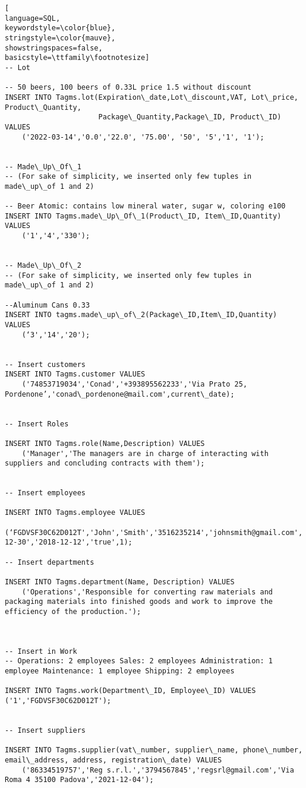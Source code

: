 \begin{lstlisting}[
language=SQL,
keywordstyle=\color{blue},
stringstyle=\color{mauve},
showstringspaces=false,
basicstyle=\ttfamily\footnotesize]
-- Lot

-- 50 beers, 100 beers of 0.33L price 1.5 without discount
INSERT INTO Tagms.lot(Expiration\_date,Lot\_discount,VAT, Lot\_price, Product\_Quantity,
                      Package\_Quantity,Package\_ID, Product\_ID) VALUES
    ('2022-03-14','0.0','22.0', '75.00', '50', '5','1', '1');


-- Made\_Up\_Of\_1
-- (For sake of simplicity, we inserted only few tuples in made\_up\_of 1 and 2)

-- Beer Atomic: contains low mineral water, sugar w, coloring e100
INSERT INTO Tagms.made\_Up\_Of\_1(Product\_ID, Item\_ID,Quantity) VALUES
    ('1','4','330');


-- Made\_Up\_Of\_2
-- (For sake of simplicity, we inserted only few tuples in made\_up\_of 1 and 2)

--Aluminum Cans 0.33
INSERT INTO tagms.made\_up\_of\_2(Package\_ID,Item\_ID,Quantity) VALUES
    (‘3','14','20');									


-- Insert customers
INSERT INTO Tagms.customer VALUES
    ('74853719034','Conad','+393895562233','Via Prato 25, Pordenone’,'conad\_pordenone@mail.com',current\_date);


-- Insert Roles

INSERT INTO Tagms.role(Name,Description) VALUES
    ('Manager','The managers are in charge of interacting with suppliers and concluding contracts with them');


-- Insert employees

INSERT INTO Tagms.employee VALUES
    (‘FGDVSF30C62D012T','John','Smith','3516235214','johnsmith@gmail.com','1995-12-30','2018-12-12','true',1);

-- Insert departments

INSERT INTO Tagms.department(Name, Description) VALUES
    ('Operations','Responsible for converting raw materials and packaging materials into finished goods and work to improve the efficiency of the production.');



-- Insert in Work
-- Operations: 2 employees Sales: 2 employees Administration: 1 employee Maintenance: 1 employee Shipping: 2 employees

INSERT INTO Tagms.work(Department\_ID, Employee\_ID) VALUES ('1','FGDVSF30C62D012T');


-- Insert suppliers

INSERT INTO Tagms.supplier(vat\_number, supplier\_name, phone\_number, email\_address, address, registration\_date) VALUES
    ('86334519757','Reg s.r.l.','3794567845','regsrl@gmail.com','Via Roma 4 35100 Padova','2021-12-04');



\end{lstlisting}
